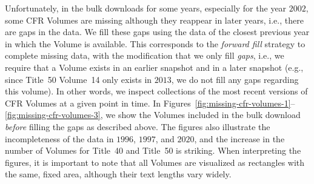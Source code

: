 \documentclass[utf8,sort&compress,numbers,square,table,hidelinks]{frontiers_suppmat} %
\begin{document}
Unfortunately, in the bulk downloads for some years, especially for the year $2002$, some CFR Volumes are missing although they reappear in later years, i.e., there are gaps in the data. 
We fill these gaps using the data of the closest previous year in which the Volume is available. 
This corresponds to the \emph{forward fill} strategy to complete missing data, with the modification that we only fill \emph{gaps}, 
i.e., we require that a Volume exists in an earlier snapshot and in a later snapshot (e.g., since Title~50 Volume~14 only exists in $2013$, we do not fill any gaps regarding this volume).
In other words, we inspect collections of the most recent versions of CFR Volumes at a given point in time.  
In Figures~\ref{fig:missing-cfr-volumes-1}--\ref{fig:missing-cfr-volumes-3}, we show the Volumes included in the bulk download \emph{before} filling the gaps as described above. 
The figures also illustrate the incompleteness of the data in $1996$, $1997$, and $2020$, 
and the increase in the number of Volumes for Title~40 and Title~50 is striking. 
When interpreting the figures, it is important to note that all Volumes are visualized as rectangles with the same, fixed area, although their text lengths vary widely.
\end{document}
